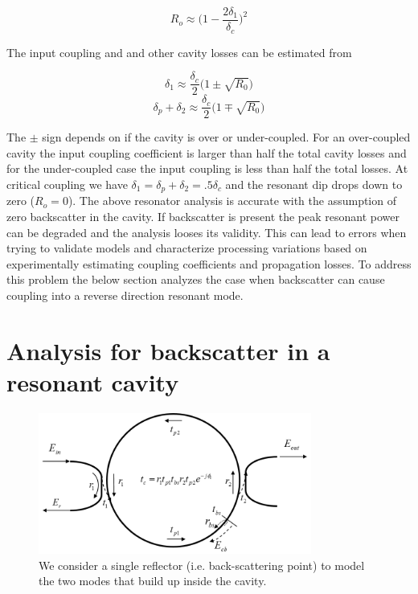 \documentclass[10pt]{article}
\begin{document}
\begin{equation} 
R_o \approx \Big( 1 -  \frac{2 \delta_1}{\delta_c}       \Big)^2
\end{equation}

\noindent  The input coupling and and other cavity losses can be estimated from

\begin{equation} 
\delta_1 \approx \frac{\delta_c}{2} \big(1 \pm \sqrt{R_0} \big) 
\end{equation}
\begin{equation} 
\delta_p + \delta_2  \approx \frac{\delta_c}{2} \big(1 \mp \sqrt{R_0} \big) 
\end{equation}

\noindent  The $\pm$ sign depends on if the cavity is over or under-coupled. For an over-coupled cavity the input coupling coefficient is larger than half the total cavity losses and for the under-coupled case the input coupling is less than half the total losses. At critical coupling we have  $\delta_1 = \delta_p + \delta_2 = .5\delta_c$  and the resonant dip drops down to zero ($R_o = 0$).  
The above  resonator analysis is accurate with the assumption of zero backscatter in the cavity.  If backscatter is present the peak resonant power can be degraded and the analysis looses its validity.  This can lead to errors when trying to validate models and characterize processing variations based on experimentally estimating coupling coefficients and propagation losses.  To address this problem the below section analyzes the case when backscatter can cause coupling into a reverse direction resonant mode.  



\section{Analysis for backscatter in a resonant cavity}

\begin{figure}[htbp]
\centering\includegraphics[width=0.8\textwidth]{figures/bs_v3}
\caption{We consider a single reflector (i.e. back-scattering point) to model the two modes that build up inside the cavity.}
\label{fig:bs}
\end{figure}
\end{document}
